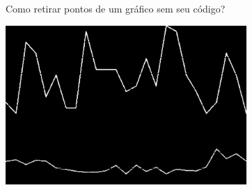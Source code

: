 \documentclass[
  ignorenonframetext,
]{beamer}
\newenvironment{Shaded}{\begin{snugshade}}{\end{snugshade}}
\newcommand{\DataTypeTok}[1]{\textcolor[rgb]{0.13,0.29,0.53}{#1}}
\newcommand{\KeywordTok}[1]{\textcolor[rgb]{0.13,0.29,0.53}{\textbf{#1}}}
\newcommand{\NormalTok}[1]{#1}
\newcommand{\OperatorTok}[1]{\textcolor[rgb]{0.81,0.36,0.00}{\textbf{#1}}}
\newcommand{\StringTok}[1]{\textcolor[rgb]{0.31,0.60,0.02}{#1}}
\begin{document}
\begin{frame}[fragile]{Como retirar pontos de um gráfico sem seu
código?}
\protect\hypertarget{como-retirar-pontos-de-um-gruxe1fico-sem-seu-cuxf3digo-4}{}

\small

\begin{Shaded}
\end{Shaded}

\includegraphics[width=3.6in]{IMAGENS/grafico_ponto3}

\begin{center}
\tiny{}
\end{center}

\end{frame}
\end{document}
